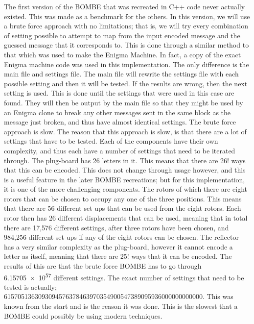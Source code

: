 \documentclass[12pt,a4paper]{article}
\begin{document}
The first version of the BOMBE that was recreated in C++ code never actually existed. This was made as a benchmark for the others. In this version, we will use a brute force approach with no limitations; that is, we will try every combination of setting possible to attempt to map from the input encoded message and the guessed message that it corresponds to. This is done through a similar method to that which was used to make the Enigma Machine. In fact, a copy of the exact Enigma machine code was used in this implementation. The only difference is the main file and settings file. The main file will rewrite the settings file with each possible setting and then it will be tested. If the results are wrong, then the next setting is used. This is done until the settings that were used in this case are found. They will then be output by the main file so that they might be used by an Enigma clone to break any other messages sent in the same block as the message just broken, and thus have almost identical settings. The brute force approach is slow. The reason that this approach is slow, is that there are a lot of settings that have to be tested. Each of the components have their own complexity, and thus each have a number of settings that need to be iterated through. The plug-board has 26 letters in it. This means that there are 26! ways that this can be encoded. This does not change through usage however, and this is a useful feature in the later BOMBE recreations; but for this implementation, it is one of the more challenging components. The rotors of which there are eight rotors that can be chosen to occupy any one of the three positions. This means that there are 56 different set ups that can be used from the eight rotors. Each rotor then has 26 different displacements that can be used, meaning that in total there are 17,576 different settings, after three rotors have been chosen, and 984,256 different set ups if any of the eight rotors can be chosen. The reflector has a very similar complexity as the plug-board, however it cannot encode a letter as itself, meaning that there are 25! ways that it can be encoded. The results of this are that the brute force BOMBE has to go through \num{6.15705e57} different settings. The exact number of settings that need to be tested is actually; \num{6157051363093094576378463970354900547389095936000000000000}. This was known from the start and is the reason it was done. This is the slowest that a BOMBE could possibly be using modern techniques. \\
\end{document}
